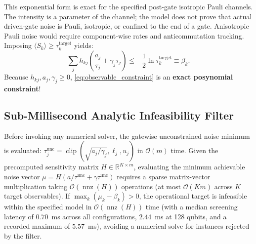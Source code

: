 \documentclass[10pt,letterpaper,journal]{IEEEtran}
\begin{document}
This exponential form is exact for the specified post-gate isotropic Pauli channels. The intensity is a parameter of the channel; the model does not prove that actual driven-gate noise is Pauli, isotropic, or confined to the end of a gate. Anisotropic Pauli noise would require component-wise rates and anticommutation tracking. Imposing $\langle S_k \rangle \ge \tau_k^{\mathrm{target}}$ yields:
\begin{equation}\label{eq:observable_constraint}
\sum_j h_{kj} \left( \frac{a_j}{\tau_j} + \gamma_j \tau_j \right) \le -\frac{1}{2} \ln \tau_k^{\mathrm{target}} \equiv \beta_k.
\end{equation}
Because $h_{kj}, a_j, \gamma_j \ge 0$, \eqref{eq:observable_constraint} is an \textbf{exact posynomial constraint}!

\subsection{Sub-Millisecond Analytic Infeasibility Filter}
Before invoking any numerical solver, the gatewise unconstrained noise minimum is evaluated: $\tau_j^{\mathrm{unc}} = \operatorname{clip}( \sqrt{a_j/\gamma_j}, \ell_j, u_j )$ in $\mathcal{O}(m)$ time. Given the precomputed sensitivity matrix $H \in \mathbb{R}^{K \times m}$, evaluating the minimum achievable noise vector $\mu = H (a/\tau^{\mathrm{unc}} + \gamma\tau^{\mathrm{unc}})$ requires a sparse matrix-vector multiplication taking $\mathcal{O}(\operatorname{nnz}(H))$ operations (at most $\mathcal{O}(Km)$ across $K$ target observables). If $\max_k (\mu_k - \beta_k) > 0$, the operational target is infeasible within the specified model in $\mathcal{O}(\operatorname{nnz}(H))$ time (with a median screening latency of $0.70$~ms across all configurations, $2.44$~ms at 128 qubits, and a recorded maximum of $5.57$~ms), avoiding a numerical solve for instances rejected by the filter.
\end{document}
